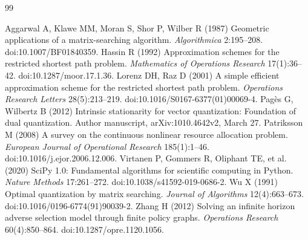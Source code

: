 \begin{thebibliography}{99}\raggedright
{}
Aggarwal A, Klawe MM, Moran S, Shor P, Wilber R (1987) Geometric applications of a matrix-searching algorithm. \emph{Algorithmica} 2:195--208. doi:10.1007/BF01840359.
Hassin R (1992) Approximation schemes for the restricted shortest path problem. \emph{Mathematics of Operations Research} 17(1):36--42. doi:10.1287/moor.17.1.36.
Lorenz DH, Raz D (2001) A simple efficient approximation scheme for the restricted shortest path problem. \emph{Operations Research Letters} 28(5):213--219. doi:10.1016/S0167-6377(01)00069-4.
Pag\`es G, Wilbertz B (2012) Intrinsic stationarity for vector quantization: Foundation of dual quantization. Author manuscript, arXiv:1010.4642v2, March 27.
Patriksson M (2008) A survey on the continuous nonlinear resource allocation problem. \emph{European Journal of Operational Research} 185(1):1--46. doi:10.1016/j.ejor.2006.12.006.
Virtanen P, Gommers R, Oliphant TE, et al. (2020) SciPy 1.0: Fundamental algorithms for scientific computing in Python. \emph{Nature Methods} 17:261--272. doi:10.1038/s41592-019-0686-2.
Wu X (1991) Optimal quantization by matrix searching. \emph{Journal of Algorithms} 12(4):663--673. doi:10.1016/0196-6774(91)90039-2.
Zhang H (2012) Solving an infinite horizon adverse selection model through finite policy graphs. \emph{Operations Research} 60(4):850--864. doi:10.1287/opre.1120.1056.
\end{thebibliography}
